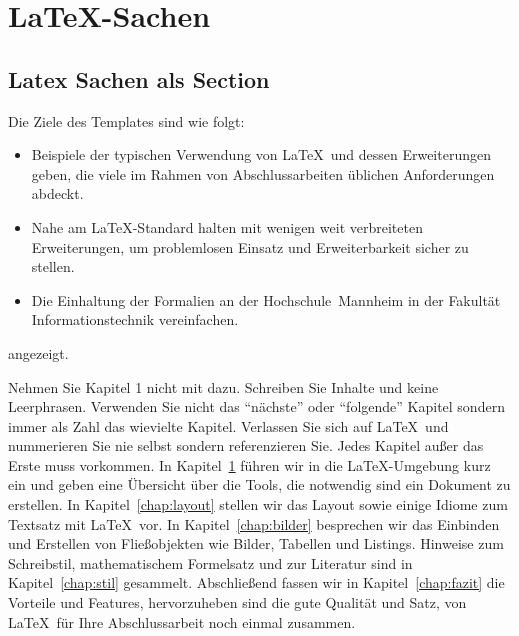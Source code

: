 \documentclass[11pt,a4paper]{report}
\begin{document}
\chapter{\LaTeX-Sachen} \label{chap:latex}
\section{Latex Sachen als Section}

Die Ziele des Templates sind wie folgt:
\begin{itemize}
\item Beispiele der typischen Verwendung von \LaTeX\ und dessen Erweiterungen 
  geben, die viele im Rahmen von Abschlussarbeiten üblichen Anforderungen 
  abdeckt.
\item Nahe am \LaTeX-Standard halten mit wenigen weit verbreiteten 
  Erweiterungen, um problemlosen Einsatz und Erweiterbarkeit sicher zu stellen.
\item Die Einhaltung der Formalien an der Hochschule~Mannheim in der
  Fakultät Informationstechnik vereinfachen.
\end{itemize}

 angezeigt. 


Nehmen Sie Kapitel 1 nicht mit dazu. Schreiben Sie Inhalte und keine
Leerphrasen. Verwenden Sie nicht das "`nächste"' oder "`folgende"' Kapitel
sondern immer als Zahl das wievielte Kapitel. 
Verlassen Sie sich auf \LaTeX\ und nummerieren Sie nie selbst sondern
referenzieren Sie. Jedes Kapitel außer das Erste muss vorkommen. 
In Kapitel~\ref{chap:latex} führen wir in die \LaTeX-Umgebung kurz ein und 
geben eine Übersicht über die Tools, die notwendig sind ein Dokument zu 
erstellen.
In Kapitel~\ref{chap:layout} stellen wir das Layout sowie einige Idiome 
zum Textsatz mit \LaTeX\ vor. 
In Kapitel~\ref{chap:bilder} besprechen wir das Einbinden und Erstellen 
von Fließobjekten wie Bilder, Tabellen und Listings.
Hinweise zum Schreibstil, mathematischem Formelsatz und zur Literatur sind 
in Kapitel~\ref{chap:stil} gesammelt.
Abschließend fassen wir in Kapitel~\ref{chap:fazit} die Vorteile und Features,
hervorzuheben sind die gute Qualität und Satz,
von \LaTeX\ für Ihre Abschlussarbeit noch einmal zusammen.
\end{document}
